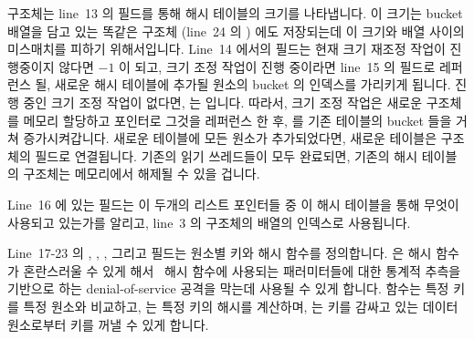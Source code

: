  구조체는 line~13 의  필드를 통해 해시 테이블의 크기를
나타냅니다.
이 크기는 bucket 배열을 담고 있는 똑같은 구조체 (line~24 의 )
에도 저장되는데 이 크기와 배열 사이의 미스매치를 피하기 위해서입니다.
Line~14 에서의  필드는 현재 크기 재조정 작업이 진행중이지
않다면 $-1$ 이 되고, 크기 조정 작업이 진행 중이라면 line~15 의 
필드로 레퍼런스 될, 새로운 해시 테이블에 추가될 원소의 bucket 의 인덱스를
가리키게 됩니다.
진행 중인 크기 조정 작업이 없다면,  는  입니다.
따라서, 크기 조정 작업은 새로운  구조체를 메모리 할당하고 
포인터로 그것을 레퍼런스 한 후,  를 기존 테이블의 bucket
들을 거쳐 증가시켜갑니다.
새로운 테이블에 모든 원소가 추가되었다면, 새로운 테이블은  구조체의
 필드로 연결됩니다.
기존의 읽기 쓰레드들이 모두 완료되면, 기존의 해시 테이블의  구조체는
메모리에서 해제될 수 있을 겁니다.

Line~16 에 있는  필드는 이 두개의 리스트 포인터들 중 이 해시
테이블을 통해 무엇이 사용되고 있는가를 알리고, line~3 의 
구조체의  배열의 인덱스로 사용됩니다.

Line~17-23 의 , , ,
그리고  필드는 원소별 키와 해시 함수를 정의합니다.
 은 해시 함수가 혼란스러울 수 있게
해서~\cite{McKenney89c,McKenney90,McKenney91} 해시 함수에 사용되는 패러미터들에
대한 통계적 추측을 기반으로 하는 denial-of-service 공격을 막는데 사용될 수 있게
합니다.
 함수는 특정 키를 특정 원소와 비교하고,  는
특정 키의 해시를 계산하며,  는 키를 감싸고 있는 데이터
원소로부터 키를 꺼낼 수 있게 합니다.

